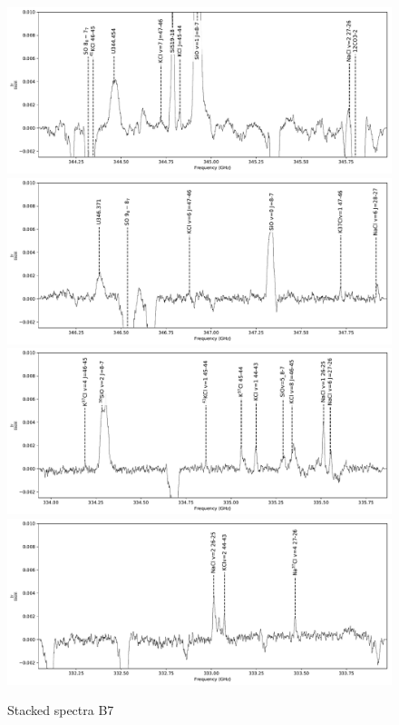 \documentclass[twocolumn]{aastex62}
\begin{document}
\begin{figure}[!htp]
\includegraphics[scale=1,width=6in]{figures/lines_labeled_OrionSourceI_B7.lb_spw0_robust0.5.pdf}
\includegraphics[scale=1,width=6in]{figures/lines_labeled_OrionSourceI_B7.lb_spw1_robust0.5.pdf}
\includegraphics[scale=1,width=6in]{figures/lines_labeled_OrionSourceI_B7.lb_spw2_robust0.5.pdf}
\includegraphics[scale=1,width=6in]{figures/lines_labeled_OrionSourceI_B7.lb_spw3_robust0.5.pdf}
\caption{Stacked spectra B7}
\label{fig:spectrab7}
\end{figure}
\end{document}

